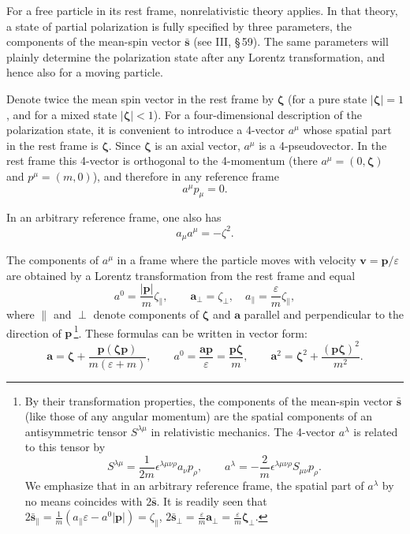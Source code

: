 For a free particle in its rest frame, nonrelativistic theory applies. In that theory, a state of partial polarization is fully specified by three parameters, the components of the mean-spin vector $\bar{\mathbf{s}}$ (see III, \S\,59). The same parameters will plainly determine the polarization state after any Lorentz transformation, and hence also for a moving particle.

Denote twice the mean spin vector in the rest frame by $\boldsymbol{\zeta}$ (for a pure state $|\boldsymbol{\zeta}| = 1$, and for a mixed state $|\boldsymbol{\zeta}| < 1$). For a four-dimensional description of the polarization state, it is convenient to introduce a 4-vector $a^\mu$ whose spatial part in the rest frame is $\boldsymbol{\zeta}$. Since $\boldsymbol{\zeta}$ is an axial vector, $a^\mu$ is a 4-pseudovector. In the rest frame this 4-vector is orthogonal to the 4-momentum (there $a^\mu = (0,\boldsymbol{\zeta})$ and $p^\mu = (m,0)$), and therefore in any reference frame
\begin{equation}
a^\mu p_\mu = 0.
\tag{29.6}
\end{equation}

In an arbitrary reference frame, one also has
\begin{equation}
a_\mu a^\mu = -\zeta^2.
\tag{29.7}
\end{equation}

The components of $a^\mu$ in a frame where the particle moves with velocity $\mathbf{v} = \mathbf{p}/\varepsilon$ are obtained by a Lorentz transformation from the rest frame and equal
\begin{equation}
a^0 = \frac{|\mathbf{p}|}{m}\zeta_\|,\qquad \mathbf{a}_\perp = \zeta_\perp,\quad a_\| = \frac{\varepsilon}{m}\zeta_\|,
\tag{29.8}
\end{equation}
where $\|$ and $\perp$ denote components of $\boldsymbol{\zeta}$ and $\mathbf{a}$ parallel and perpendicular to the direction of $\mathbf{p}$\,\footnote{By their transformation properties, the components of the mean-spin vector $\bar{\mathbf{s}}$ (like those of any angular momentum) are the spatial components of an antisymmetric tensor $S^{\lambda\mu}$ in relativistic mechanics. The 4-vector $a^\lambda$ is related to this tensor by
\[
S^{\lambda\mu} = \frac{1}{2m}\epsilon^{\lambda\mu\nu\rho}a_\nu p_\rho,\qquad a^\lambda = -\frac{2}{m}\epsilon^{\lambda\mu\nu\rho}S_{\mu\nu}p_\rho.
\]
We emphasize that in an arbitrary reference frame, the spatial part of $a^\lambda$ by no means coincides with $2\bar{\mathbf{s}}$. It is readily seen that
$2\bar{\mathbf{s}}_\| = \frac{1}{m}(a_\|\varepsilon - a^0|\mathbf{p}|) = \zeta_\|$, $2\bar{\mathbf{s}}_\perp = \frac{\varepsilon}{m}\mathbf{a}_\perp = \frac{\varepsilon}{m}\boldsymbol{\zeta}_\perp$.}. These formulas can be written in vector form:
\begin{equation}
\mathbf{a} = \boldsymbol{\zeta} + \frac{\mathbf{p}(\boldsymbol{\zeta}\mathbf{p})}{m(\varepsilon + m)},\qquad a^0 = \frac{\mathbf{a}\mathbf{p}}{\varepsilon} = \frac{\mathbf{p}\boldsymbol{\zeta}}{m},\qquad \mathbf{a}^2 = \boldsymbol{\zeta}^2 + \frac{(\mathbf{p}\boldsymbol{\zeta})^2}{m^2}.
\tag{29.9}
\end{equation}

